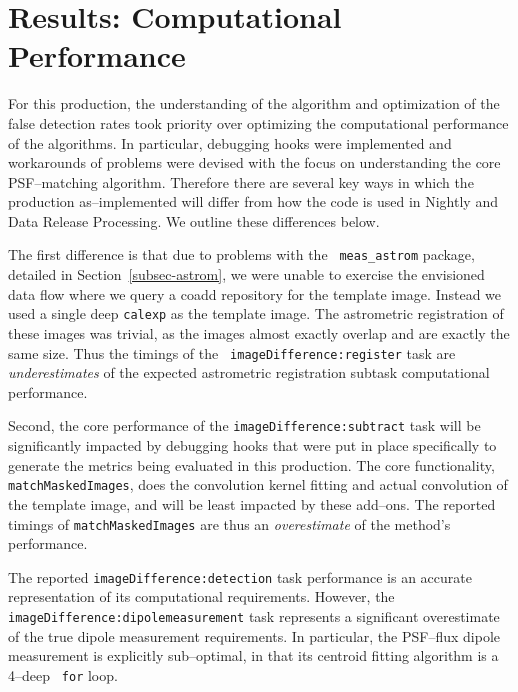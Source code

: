 \documentclass[prd, nofootinbib, floatfix, 11pt,tightenlines,times]{article}
\begin{document}
\section{Results: Computational Performance}

For this production, the understanding of the algorithm and
optimization of the false detection rates took priority over
optimizing the computational performance of the algorithms.  In
particular, debugging hooks were implemented and workarounds of
problems were devised with the focus on understanding the core
PSF--matching algorithm.  Therefore there are several key ways in
which the production as--implemented will differ from how the code is
used in Nightly and Data Release Processing.  We outline these
differences below.

The first difference is that due to problems with the {\tt
  meas\_astrom} package, detailed in Section~\ref{subsec-astrom}, we
were unable to exercise the envisioned data flow where we query a
coadd repository for the template image.  Instead we used a single
deep {\tt calexp} as the template image.  The astrometric registration
of these images was trivial, as the images almost exactly overlap and
are exactly the same size.  Thus the timings of the {\tt
  imageDifference:register} task are {\it underestimates} of the
expected astrometric registration subtask computational performance.

Second, the core performance of the {\tt imageDifference:subtract}
task will be significantly impacted by debugging hooks that were put
in place specifically to generate the metrics being evaluated in this
production.  The core functionality, {\tt matchMaskedImages}, does the
convolution kernel fitting and actual convolution of the template
image, and will be least impacted by these add--ons.  The reported
timings of {\tt matchMaskedImages} are thus an {\it overestimate} of
the method's performance.

The reported {\tt imageDifference:detection} task performance is an
accurate representation of its computational requirements.  However,
the {\tt imageDifference:dipolemeasurement} task represents a
significant overestimate of the true dipole measurement requirements.
In particular, the PSF--flux dipole measurement is explicitly
sub--optimal, in that its centroid fitting algorithm is a 4--deep {\tt
  for} loop.

\end{document}
